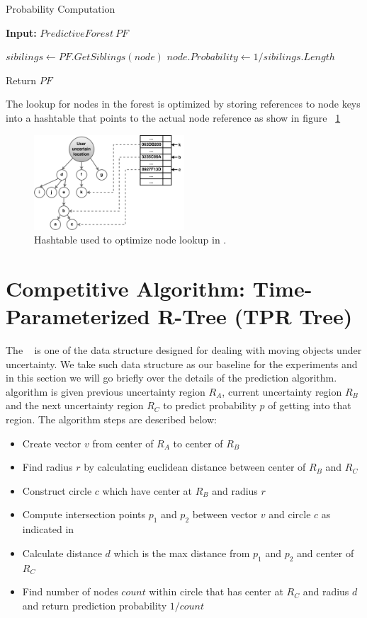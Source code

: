 \begin{algorithm} [ht]
\caption{Probability Computation}
\label{alg:prob}
\begin{footnotesize}
\textbf{Input:} $PredictiveForest~PF$
\begin{algorithmic}[1]
    \STATE $sibilings \leftarrow PF.GetSiblings(node)$
    \STATE $node.Probability \leftarrow 1 / sibilings.Length$
\ENDFOR

\STATE Return $PF$
\end{algorithmic}
\end{footnotesize}
\end{algorithm}

The lookup for nodes in the forest is optimized by storing references to node keys into a hashtable that points to the actual node reference as show in figure ~\ref{fig:hashtable}

\begin{figure}[ht]
  \centering
    \includegraphics[width=0.5\textwidth]{Hashtable}
  \caption{Hashtable used to optimize node lookup in \pf.}
  \label{fig:hashtable}
\end{figure}

\section {Competitive Algorithm: Time-Parameterized R-Tree (TPR Tree)}
\label{sec:tpr}
The \TPR ~\cite{Saltenis00} is one of the data structure designed for dealing with moving objects under uncertainty. We take such data structure as our baseline for the experiments and in this section we will go briefly over the details of the \TPR prediction algorithm.
\TPR algorithm is given previous uncertainty region $R_A$, current uncertainty region $R_B$ and the next uncertainty region $R_C$ to predict probability $p$ of getting into that region. The algorithm steps are described below:
\begin{itemize}
\item Create vector $v$ from center of $R_A$ to center of $R_B$
\item Find radius $r$ by calculating euclidean distance between center of $R_B$ and $R_C$
\item Construct circle $c$ which have center at $R_B$ and radius $r$
\item Compute intersection points $p_1$ and $p_2$ between vector $v$ and circle $c$ as indicated in \cite{Middleditch88}
\item Calculate distance $d$ which is the max distance from $p_1$ and $p_2$ and center of $R_C$
\item Find number of nodes $count$ within circle that has center at $R_C$ and radius $d$ and return prediction probability $1/count$
\end{itemize}

